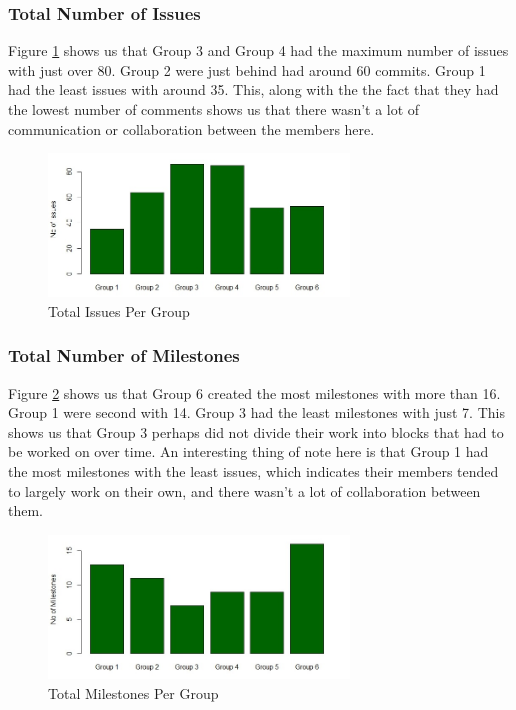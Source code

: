 \documentclass{acm_proc_article-sp}
\begin{document}
\subsubsection{Total Number of Issues}
Figure \ref{fig:grIssue} shows us that Group 3 and Group 4 had the maximum number of issues with just over 80. Group 2 were just behind had around 60 commits. Group 1 had the least issues with around 35. This, along with the the fact that they had the lowest number of comments shows us that there wasn't a lot of communication or collaboration between the members here.

\begin{figure}[h]
\centering
\includegraphics[width=8cm]{img/grIssue}
\caption{Total Issues Per Group}
\label{fig:grIssue}
\end{figure}

\subsubsection{Total Number of Milestones}
Figure \ref{fig:grMilestones} shows us that Group 6 created the most milestones with more than 16. Group 1 were second with 14. Group 3 had the least milestones with just 7. This shows us that Group 3 perhaps did not divide their work into blocks that had to be worked on over time. An interesting thing of note here is that Group 1 had the most milestones with the least issues, which indicates their members tended to largely work on their own, and there wasn't a lot of collaboration between them.

\begin{figure}[h]
\centering
\includegraphics[width=8cm]{img/milestone}
\caption{Total Milestones Per Group}
\label{fig:grMilestones}
\end{figure}
\end{document}
